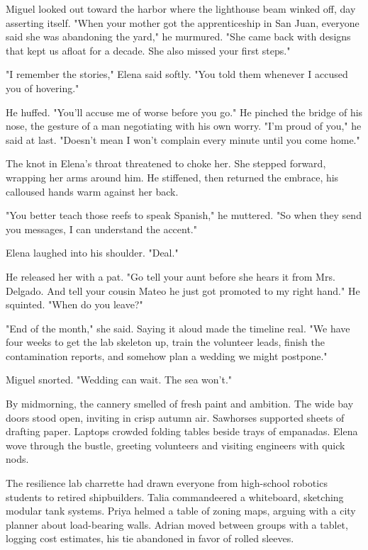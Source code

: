 Miguel looked out toward the harbor where the lighthouse beam winked off, day asserting itself. "When your mother got the apprenticeship in San Juan, everyone said she was abandoning the yard," he murmured. "She came back with designs that kept us afloat for a decade. She also missed your first steps."

"I remember the stories," Elena said softly. "You told them whenever I accused you of hovering."

He huffed. "You'll accuse me of worse before you go." He pinched the bridge of his nose, the gesture of a man negotiating with his own worry. "I'm proud of you," he said at last. "Doesn't mean I won't complain every minute until you come home."

The knot in Elena's throat threatened to choke her. She stepped forward, wrapping her arms around him. He stiffened, then returned the embrace, his calloused hands warm against her back.

"You better teach those reefs to speak Spanish," he muttered. "So when they send you messages, I can understand the accent."

Elena laughed into his shoulder. "Deal."

He released her with a pat. "Go tell your aunt before she hears it from Mrs. Delgado. And tell your cousin Mateo he just got promoted to my right hand." He squinted. "When do you leave?"

"End of the month," she said. Saying it aloud made the timeline real. "We have four weeks to get the lab skeleton up, train the volunteer leads, finish the contamination reports, and somehow plan a wedding we might postpone."

Miguel snorted. "Wedding can wait. The sea won't."

\bigskip

By midmorning, the cannery smelled of fresh paint and ambition. The wide bay doors stood open, inviting in crisp autumn air. Sawhorses supported sheets of drafting paper. Laptops crowded folding tables beside trays of empanadas. Elena wove through the bustle, greeting volunteers and visiting engineers with quick nods.

The resilience lab charrette had drawn everyone from high-school robotics students to retired shipbuilders. Talia commandeered a whiteboard, sketching modular tank systems. Priya helmed a table of zoning maps, arguing with a city planner about load-bearing walls. Adrian moved between groups with a tablet, logging cost estimates, his tie abandoned in favor of rolled sleeves.

